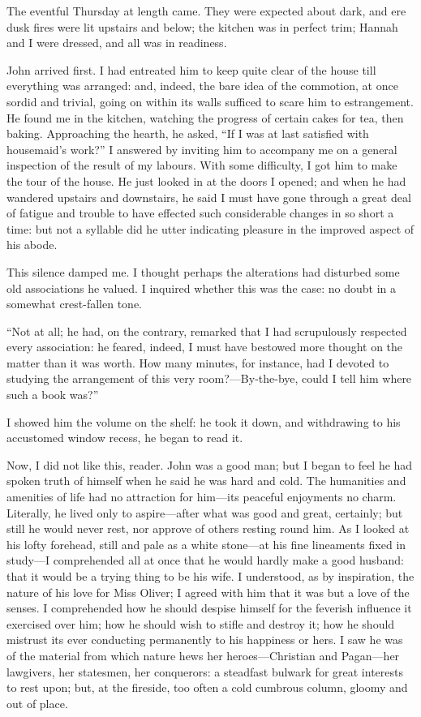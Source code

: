 The eventful Thursday at length came. They were expected about dark,
and ere dusk fires were lit upstairs and below; the kitchen was in
perfect trim; Hannah and I were dressed, and all was in readiness.

\St{} John arrived first. I had entreated him to keep quite clear of the
house till everything was arranged: and, indeed, the bare idea of the
commotion, at once sordid and trivial, going on within its walls
sufficed to scare him to estrangement. He found me in the kitchen,
watching the progress of certain cakes for tea, then baking. 
Approaching the hearth, he asked, \enquote{If I was at last satisfied
with housemaid's work?} I answered by inviting him to accompany me on a
general inspection of the result of my labours. With some difficulty, I
got him to make the tour of the house. He just looked in at the doors I
opened; and when he had wandered upstairs and downstairs, he said I must
have gone through a great deal of fatigue and trouble to have effected
such considerable changes in so short a time: but not a syllable did he
utter indicating pleasure in the improved aspect of his abode.

This silence damped me. I thought perhaps the alterations had disturbed
some old associations he valued. I inquired whether this was the case:
no doubt in a somewhat crest-fallen tone.

\enquote{Not at all; he had, on the contrary, remarked that I had
scrupulously respected every association: he feared, indeed, I must have
bestowed more thought on the matter than it was worth. How many
minutes, for instance, had I devoted to studying the arrangement of this
very room?---By-the-bye, could I tell him where such a book was?}

I showed him the volume on the shelf: he took it down, and withdrawing
to his accustomed window recess, he began to read it.

Now, I did not like this, reader. \St{} John was a good man; but I began
to feel he had spoken truth of himself when he said he was hard and
cold. The humanities and amenities of life had no attraction for
him---its peaceful enjoyments no charm. Literally, he lived only to
aspire---after what was good and great, certainly; but still he would
never rest, nor approve of others resting round him. As I looked at his
lofty forehead, still and pale as a white stone---at his fine lineaments
fixed in study---I comprehended all at once that he would hardly make a
good husband: that it would be a trying thing to be his wife. I
understood, as by inspiration, the nature of his love for Miss Oliver; I
agreed with him that it was but a love of the senses. I comprehended
how he should despise himself for the feverish influence it exercised
over him; how he should wish to stifle and destroy it; how he should
mistrust its ever conducting permanently to his happiness or hers. I
saw he was of the material from which nature hews her heroes---Christian
and Pagan---her lawgivers, her statesmen, her conquerors: a steadfast
bulwark for great interests to rest upon; but, at the fireside, too
often a cold cumbrous column, gloomy and out of place.

